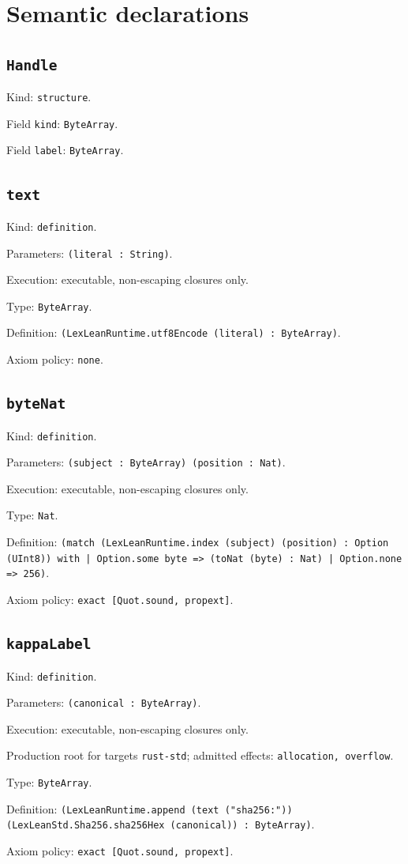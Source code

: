 \documentclass[11pt]{article}
\begin{document}
\section*{Semantic declarations}
\subsection*{\texttt{Handle}}
\noindent Kind: \texttt{structure}.\par
\noindent Field \texttt{kind}: \texttt{ByteArray}.\par
\noindent Field \texttt{label}: \texttt{ByteArray}.\par
\subsection*{\texttt{text}}
\noindent Kind: \texttt{definition}.\par
\noindent Parameters: \texttt{(literal : String)}.\par
\noindent Execution: executable, non-escaping closures only.\par
\noindent Type: \texttt{ByteArray}.\par
\noindent Definition: \texttt{(LexLeanRuntime.utf8Encode (literal) : ByteArray)}.\par
\noindent Axiom policy: \texttt{none}.\par
\subsection*{\texttt{byteNat}}
\noindent Kind: \texttt{definition}.\par
\noindent Parameters: \texttt{(subject : ByteArray) (position : Nat)}.\par
\noindent Execution: executable, non-escaping closures only.\par
\noindent Type: \texttt{Nat}.\par
\noindent Definition: \texttt{(match (LexLeanRuntime.index (subject) (position) : Option (UInt8)) with | Option.some byte => (toNat (byte) : Nat) | Option.none => 256)}.\par
\noindent Axiom policy: \texttt{exact [Quot.sound, propext]}.\par
\subsection*{\texttt{kappaLabel}}
\noindent Kind: \texttt{definition}.\par
\noindent Parameters: \texttt{(canonical : ByteArray)}.\par
\noindent Execution: executable, non-escaping closures only.\par
\noindent Production root for targets \texttt{rust-std}; admitted effects: \texttt{allocation, overflow}.\par
\noindent Type: \texttt{ByteArray}.\par
\noindent Definition: \texttt{(LexLeanRuntime.append (text ("sha256:")) (LexLeanStd.Sha256.sha256Hex (canonical)) : ByteArray)}.\par
\noindent Axiom policy: \texttt{exact [Quot.sound, propext]}.\par
\end{document}
